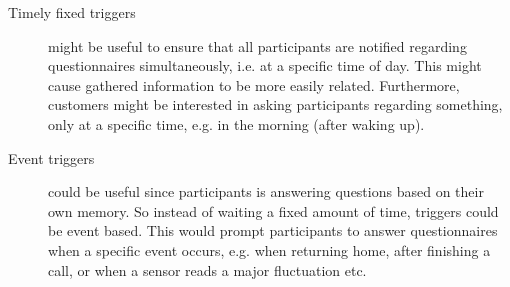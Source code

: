 \begin{description}
    \item[Timely fixed triggers] might be useful to ensure that all participants are notified regarding questionnaires simultaneously, i.e. at a specific time of day. This might cause gathered information to be more easily related. Furthermore, customers might be interested in asking participants regarding something, only at a specific time, e.g. in the morning (after waking up). 

    \item[Event triggers] could be useful since participants is answering questions based on their own memory. So instead of waiting a fixed amount of time, triggers could be event based. This would prompt participants to answer questionnaires when a specific event occurs, e.g. when returning home, after finishing a call, or when a sensor reads a major fluctuation etc.    
\end{description}    